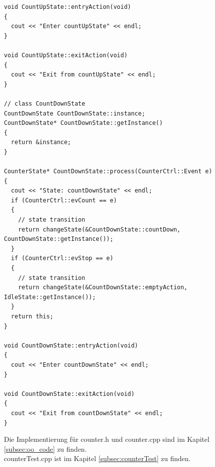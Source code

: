 \begin{itemize}
\begin{lstlisting}[style=Cpp]
void CountUpState::entryAction(void)
{
  cout << "Enter countUpState" << endl;
}

void CountUpState::exitAction(void)
{
  cout << "Exit from countUpState" << endl;
}

// class CountDownState
CountDownState CountDownState::instance;
CountDownState* CountDownState::getInstance()
{
  return &instance;
}

CounterState* CountDownState::process(CounterCtrl::Event e)
{
  cout << "State: countDownState" << endl;
  if (CounterCtrl::evCount == e)
  {
    // state transition
    return changeState(&CountDownState::countDown, CountDownState::getInstance());
  }
  if (CounterCtrl::evStop == e)
  {
    // state transition
    return changeState(&CountDownState::emptyAction, IdleState::getInstance());
  }
  return this;
}

void CountDownState::entryAction(void)
{
  cout << "Enter countDownState" << endl;
}

void CountDownState::exitAction(void)
{
  cout << "Exit from countDownState" << endl;
}
\end{lstlisting}
\end{itemize}

Die Implementierung für counter.h und counter.cpp sind im Kapitel \ref{subsec:oo_code} zu finden.\\
counterTest.cpp ist im Kapitel \ref{subsec:counterTest} zu finden.
